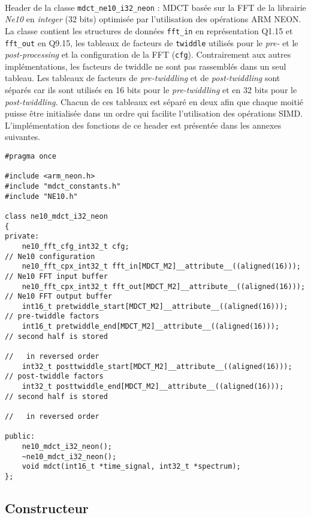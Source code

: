 \documentclass{article}
\begin{document}
\paragraph{}
Header de la classe \texttt{mdct\_ne10\_i32\_neon} : MDCT basée sur la FFT de la librairie \emph{Ne10} en \emph{integer} (32 bits) optimisée par l'utilisation des opérations ARM NEON. La classe contient les structures de données \texttt{fft\_in} en représentation Q1.15 et \texttt{fft\_out} en Q9.15, les tableaux de facteurs de \texttt{twiddle} utilisés pour le \emph{pre-} et le \emph{post-processing} et la configuration de la FFT (\texttt{cfg}). Contrairement aux autres implémentations, les facteurs de twiddle ne sont pas rassemblés dans un seul tableau. Les tableaux de facteurs de \emph{pre-twiddling} et de \emph{post-twiddling} sont séparés car ils sont utilisés en 16 bits pour le \emph{pre-twiddling} et en 32 bits pour le \emph{post-twiddling}. Chacun de ces tableaux est séparé en deux afin que chaque moitié puisse être initialisée dans un ordre qui facilite l'utilisation des opérations SIMD. L'implémentation des fonctions de ce header est présentée dans les annexes suivantes.
\lstset{language=C++}
\begin{lstlisting}
#pragma once

#include <arm_neon.h>
#include "mdct_constants.h"
#include "NE10.h"

class ne10_mdct_i32_neon
{
private:
    ne10_fft_cfg_int32_t cfg;                                          // Ne10 configuration
    ne10_fft_cpx_int32_t fft_in[MDCT_M2]__attribute__((aligned(16)));  // Ne10 FFT input buffer
    ne10_fft_cpx_int32_t fft_out[MDCT_M2]__attribute__((aligned(16))); // Ne10 FFT output buffer
    int16_t pretwiddle_start[MDCT_M2]__attribute__((aligned(16)));     // pre-twiddle factors
    int16_t pretwiddle_end[MDCT_M2]__attribute__((aligned(16)));       // second half is stored
                                                                       //   in reversed order
    int32_t posttwiddle_start[MDCT_M2]__attribute__((aligned(16)));    // post-twiddle factors
    int32_t posttwiddle_end[MDCT_M2]__attribute__((aligned(16)));      // second half is stored
                                                                       //   in reversed order

public:
    ne10_mdct_i32_neon();
    ~ne10_mdct_i32_neon();
    void mdct(int16_t *time_signal, int32_t *spectrum);
};
\end{lstlisting}

\subsection{Constructeur}\label{app:mdct_ne10_i32_neon_constructor}
\end{document}
